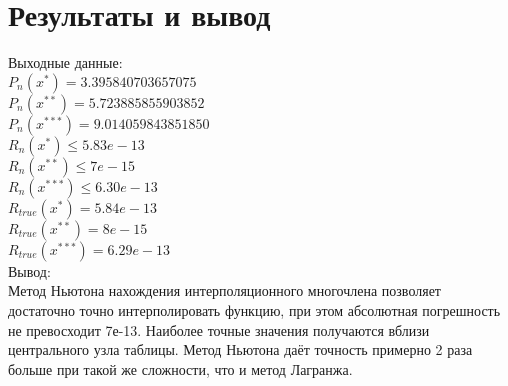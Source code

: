 \documentclass[10pt]{scrartcl}
\begin{document}
\section*{Результаты и вывод}\noindent
Выходные данные:\\
$P_n(x^*) = 3.395840703657075$\\
$P_n(x^{**}) = 5.723885855903852$\\
$P_n(x^{***})= 9.014059843851850$\\
$R_n(x^*) \leq 5.83e-13$\\
$R_n(x^{**}) \leq 7e-15$\\
$R_n(x^{***}) \leq 6.30e-13$\\
$R_{true}(x^*) = 5.84e-13$\\
$R_{true}(x^{**}) = 8e-15$\\
$R_{true}(x^{***}) = 6.29e-13$\\
Вывод:\\
Метод Ньютона нахождения интерполяционного многочлена позволяет достаточно точно интерполировать функцию, при этом абсолютная погрешность не превосходит 7е-13. Наиболее точные значения получаются вблизи центрального узла таблицы. Метод Ньютона даёт точность
примерно 2 раза больше при такой же сложности, что и метод Лагранжа.
\end{document}
